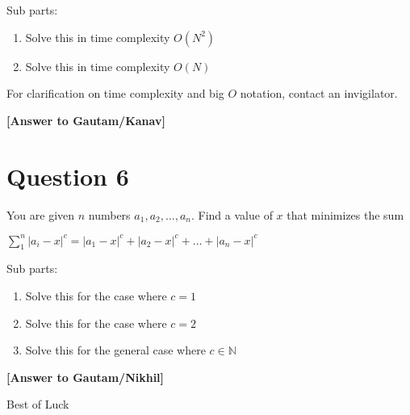 \documentclass[a4paper,12pt]{article}
\begin{document}
\noindent
Sub parts:
\begin{enumerate}[label=\alph*)]
    \item Solve this in time complexity $O(N^2)$
    \item Solve this in time complexity $O(N)$
\end{enumerate}
For clarification on time complexity and big $O$ notation, contact an invigilator.

\textbf{[Answer to Gautam/Kanav]}

\hrulefill

\section*{Question 6}

You are given $n$ numbers $a_1, a_2, \dots, a_n$. Find a value of $x$ that minimizes the sum
\begin{center}
    $\sum_1^n {|a_i - x|^c} = |a_1 - x|^c + |a_2 - x|^c + \dots + |a_n - x|^c$
\end{center}

Sub parts:
\begin{enumerate}[label=\alph*)]
    \item Solve this for the case where $c = 1$
    \item Solve this for the case where $c = 2$
    \item Solve this for the general case where $c \in \mathbb{N}$
\end{enumerate}

\textbf{[Answer to Gautam/Nikhil]}

\hrulefill

\begin{center}
    Best of Luck
\end{center}
\end{document}
